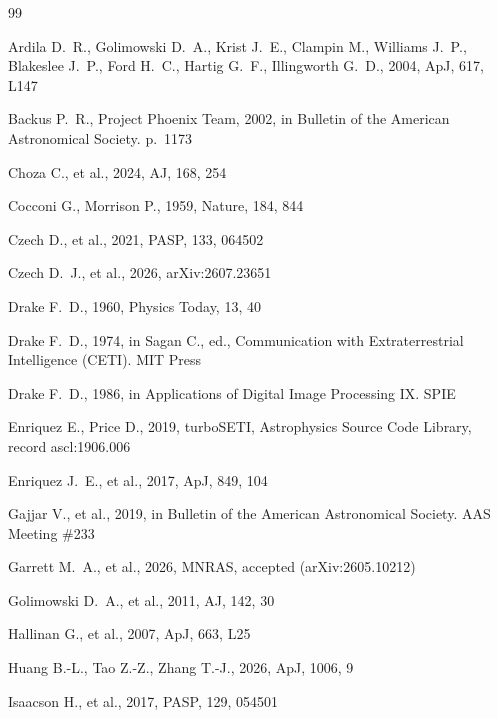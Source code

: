 \documentclass{openjournal}
\begin{document}
\clearpage
\begin{thebibliography}{99}

 Ardila D.~R., Golimowski D.~A., Krist J.~E., Clampin M., Williams J.~P., Blakeslee J.~P., Ford H.~C., Hartig G.~F., Illingworth G.~D., 2004, ApJ, 617, L147

 Backus P.~R., Project Phoenix Team, 2002, in Bulletin of the American Astronomical Society. p.\ 1173

 Choza C., et al., 2024, AJ, 168, 254

 Cocconi G., Morrison P., 1959, Nature, 184, 844

 Czech D., et al., 2021, PASP, 133, 064502

 Czech D.~J., et al., 2026, arXiv:2607.23651

 Drake F.~D., 1960, Physics Today, 13, 40

 Drake F.~D., 1974, in Sagan C., ed., Communication with Extraterrestrial Intelligence (CETI). MIT Press

 Drake F.~D., 1986, in Applications of Digital Image Processing IX. SPIE

 Enriquez E., Price D., 2019, turboSETI, Astrophysics Source Code Library, record ascl:1906.006

 Enriquez J.~E., et al., 2017, ApJ, 849, 104

 Gajjar V., et al., 2019, in Bulletin of the American Astronomical Society. AAS Meeting \#233

 Garrett M.~A., et al., 2026, MNRAS, accepted (arXiv:2605.10212)

 Golimowski D.~A., et al., 2011, AJ, 142, 30

 Hallinan G., et al., 2007, ApJ, 663, L25

 Huang B.-L., Tao Z.-Z., Zhang T.-J., 2026, ApJ, 1006, 9

 Isaacson H., et al., 2017, PASP, 129, 054501


\end{thebibliography}
\end{document}
